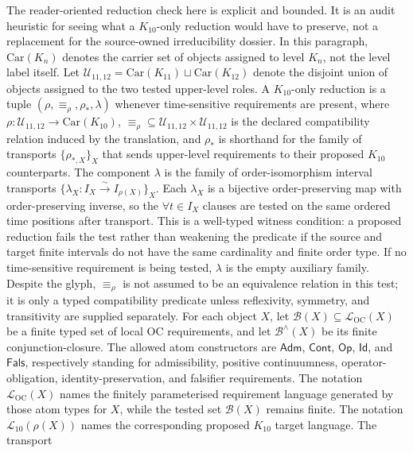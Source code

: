 The reader-oriented reduction check here is explicit and bounded. It is an
audit heuristic for seeing what a \(K_{10}\)-only reduction would have to
preserve, not a replacement for the source-owned irreducibility dossier. In this paragraph,
\(\mathrm{Car}(K_n)\) denotes the carrier set of objects assigned to level \(K_n\), not the
level label itself. Let
\(\mathcal{U}_{11,12}=\mathrm{Car}(K_{11})\sqcup \mathrm{Car}(K_{12})\) denote the disjoint union of
objects assigned to the two tested upper-level roles. A \(K_{10}\)-only
reduction is a tuple \((\rho,\equiv_{\rho},\rho_{\ast},\lambda)\) whenever
time-sensitive requirements are present, where
\(\rho:\mathcal{U}_{11,12}\to \mathrm{Car}(K_{10})\),
\(\equiv_{\rho}\subseteq\mathcal{U}_{11,12}\times\mathcal{U}_{11,12}\) is the
declared compatibility relation induced by the translation, and
\(\rho_{\ast}\) is shorthand for the family of transports
\(\{\rho_{\ast,X}\}_X\) that sends upper-level requirements to their proposed
\(K_{10}\) counterparts. The component \(\lambda\) is the family of
order-isomorphism interval transports
\(\{\lambda_X:I_X\xrightarrow{\sim} I_{\rho(X)}\}_X\). Each \(\lambda_X\) is a
bijective order-preserving map with order-preserving inverse, so the
\(\forall t\in I_X\) clauses are tested on the same ordered time positions
after transport. This is a well-typed witness condition: a proposed reduction
fails the test rather than weakening the predicate if the source and target
finite intervals do not have the same cardinality and finite order type. If no time-sensitive requirement is
being tested, \(\lambda\) is the empty auxiliary family. Despite the glyph, \(\equiv_{\rho}\) is not assumed
to be an equivalence relation in this test; it is only a typed compatibility
predicate unless reflexivity, symmetry, and transitivity are supplied
separately. For each object \(X\), let
\(\mathcal{B}(X)\subseteq\mathcal{L}_{\mathrm{OC}}(X)\) be a finite typed
set of local OC requirements, and let \(\mathcal{B}^{\wedge}(X)\) be its
finite conjunction-closure. The allowed atom constructors are
\(\mathsf{Adm}\), \(\mathsf{Cont}\), \(\mathsf{Op}\), \(\mathsf{Id}\), and
\(\mathsf{Fals}\), respectively standing for admissibility, positive
continuumness, operator-obligation, identity-preservation, and falsifier
requirements. The notation
\(\mathcal{L}_{\mathrm{OC}}(X)\) names the finitely parameterised
requirement language generated by those atom types for \(X\), while the tested
set \(\mathcal{B}(X)\) remains finite. The notation \(\mathcal{L}_{10}(\rho(X))\)
names the corresponding proposed \(K_{10}\) target language. The transport
